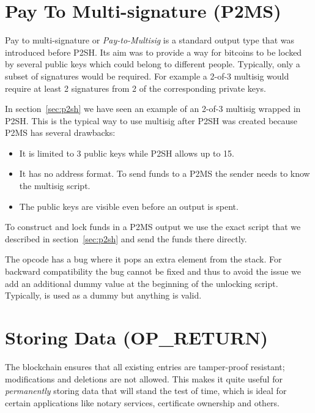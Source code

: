 \vspace{1em}


\section{Pay To Multi-signature (P2MS)}
Pay to multi-signature or \emph{Pay-to-Multisig} is a standard output type that was introduced before P2SH. Its aim was to provide a way for bitcoins to be locked by several public keys which could belong to different people. Typically, only a subset of signatures would be required. For example a 2-of-3 multisig would require at least 2 signatures from 2 of the corresponding private keys.

In section~\ref{sec:p2sh} we have seen an example of an 2-of-3 multisig wrapped in P2SH. This is the typical way to use multisig after P2SH was created because P2MS has several drawbacks:
\begin{itemize}
\item It is limited to 3 public keys while P2SH allows up to 15.
\item It has no address format. To send funds to a P2MS the sender needs to know the multisig script.
\item The public keys are visible even before an output is spent.
\end{itemize}

To construct and lock funds in a P2MS output we use the exact script that we described in section~\ref{sec:p2sh} and send the funds there directly.

\begin{note}
The  opcode has a bug where it pops an extra element from the stack. For backward compatibility the bug cannot be fixed and thus to avoid the issue we add an additional dummy value at the beginning of the unlocking script. Typically,  is used as a dummy but anything is valid.
\end{note}


\section{Storing Data (OP\_RETURN)}
\label{sec:storing-data}
The blockchain ensures that all existing entries are tamper-proof resistant; modifications and deletions are not allowed. This makes it quite useful for \emph{permanently} storing data that will stand the test of time, which is ideal for certain applications like notary services, certificate ownership and others.

